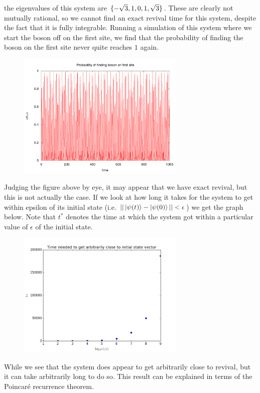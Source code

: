\documentclass[a4paper,10pt]{article}
\begin{document}
{the eigenvalues of this system are $\{-\sqrt{3},\-1,0,1,\sqrt{3}\}$. These are clearly not mutually rational, so we cannot find an exact revival time for this system, despite the fact that it is 
fully integrable. Running a simulation of this system where we start the boson off on the first site, we find that the probability of finding the boson on the first site never quite reaches $1$ again.


\begin{figure}[H]
 \includegraphics[width=8cm]{5_by_1_T1e4_U0}
 \centering
\end{figure}

Judging the figure above by eye, it may appear that we have exact revival, but this is not actually the case. If we look at how long it takes for the system to get within epsilon of
its initial state (i.e. $||\ket{\psi(t)}-\ket{\psi(0)}||<\epsilon$) 
we get the graph below. Note that $t^*$ denotes the time at which the system got within a particular value of $\epsilon$ of the initial state.
\begin{figure}[H]
 \includegraphics[width=8cm]{arbitrarily_close}
 \centering
\end{figure}

While we see that the system does appear to get arbitrarily close to revival, but it can take arbitrarily long to do so. This result can be explained in terms of the Poincar\'e recurrence theorem.
}
\end{document}
